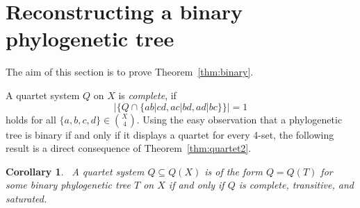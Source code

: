 \documentclass{article}
\newtheorem{corollary}{Corollary}
\begin{document}
% 
% 
% 
% 
% 

\section{Reconstructing a binary phylogenetic tree}
\label{sect:binary}

The aim of this section is to prove Theorem~\ref{thm:binary}.

A quartet system $Q$ on $X$ is \textit{complete}, if
$$|\{Q\cap \{ab|cd,ac|bd,ad|bc\}\}| = 1$$
 holds for all  $\{a,b,c,d\}\in {X \choose 4}$. Using the easy observation that 
 a phylogenetic tree is binary if and only if it displays a quartet for every 4-set, 
 the following result is a direct consequence of Theorem~\ref{thm:quartet2}.  

 
\begin{corollary}~\label{cor:quartet}
  A quartet system $Q \subseteq Q(X)$ is of the form $Q = Q(T)$ for some
binary phylogenetic tree $T$ on $X$ if and only if 
$Q$ is complete, transitive, and saturated. 
\end{corollary}

\end{document}
